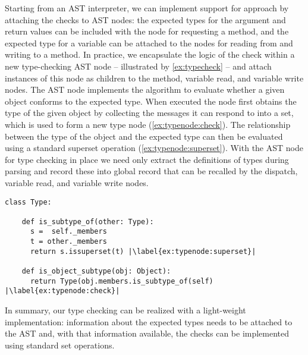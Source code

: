 Starting from an AST interpreter,
we can implement support for approach by attaching the checks to AST nodes:
the expected types for the argument and return values can be included
with the node for requesting a method, and the expected type for a variable
can be attached to the nodes for reading from and writing to a method.
In practice,
we encapsulate the logic of the check within a new type-checking AST node
-- illustrated by \cref{ex:typecheck} --
and attach instances of this node as children to the method,
variable read, and variable write nodes. 
The AST node implements the algorithm to evaluate whether a given object
conforms to the expected type.
When executed the node first obtains the type of the given object by
collecting the messages it can respond to into a set,
which is used to form a new type node (\cref{ex:typenode:check}).
The relationship between the type of the object and the expected type can
then be evaluated using a standard superset operation (\cref{ex:typenode:superset}).
With the AST node for type checking in place 
we need only extract the definitions of types during parsing 
and record these into global record that can be recalled by the
dispatch, variable read, and variable write nodes.


\begin{lstlisting}[label={ex:typenode},escapechar=|,caption={An illustration of the AST node that we use to perform type checks},float,floatplacement=htbp]
class Type:

    def is_subtype_of(other: Type):
      s =  self._members
      t = other._members
      return s.issuperset(t) |\label{ex:typenode:superset}|

    def is_object_subtype(obj: Object):
      return Type(obj.members.is_subtype_of(self) |\label{ex:typenode:check}|

\end{lstlisting}


In summary, our type checking can be realized with a light-weight implementation: 
information about the expected types needs to be attached to the AST and, 
with that information available,
the checks can be implemented using standard set operations.





